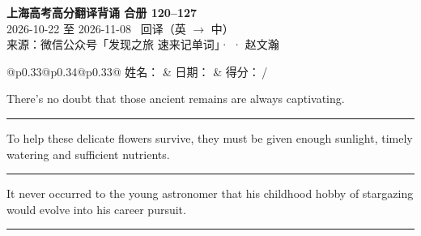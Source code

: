 \documentclass[11pt,a4paper]{article}
\newcommand{\num}[1]{\makebox[1.9em][r]{#1.}\hspace{0.3em}}
\newcommand{\wline}{\noindent\rule{\linewidth}{0.4pt}}
\begin{document}
\pagestyle{plain}
\begin{center}
{\LARGE\bfseries 上海高考高分翻译背诵 \quad 合册 120–127}\\[0.25em]
{\large 2026-10-22 至 2026-11-08 \quad\ 回译（英 $\to$ 中）}\\[0.35em]
{\footnotesize 来源：微信公众号「发现之旅 速来记单词」·  · 赵文瀚}
\end{center}

\vspace{0.4em}
\noindent\begin{tabular}{@{}p{0.33\textwidth}@{}p{0.34\textwidth}@{}p{0.33\textwidth}@{}}
姓名：\underline{\hspace{2.0cm}} & 日期：\underline{\hspace{2.0cm}} & 得分：\underline{\hspace{1.4cm}}\,/ \\
\end{tabular}

\vspace{0.5em}

\vspace{0.8em}
\vspace{0.35em}\vspace{0.15em}

\begin{minipage}{\linewidth}

\num{1}There’s no doubt that those ancient remains are always captivating.

\vspace{0.25em}

\wline

\end{minipage}

\begin{minipage}{\linewidth}

\num{2}To help these delicate flowers survive, they must be given enough sunlight, timely watering and sufficient nutrients.

\vspace{0.25em}

\wline

\end{minipage}

\begin{minipage}{\linewidth}

\num{3}It never occurred to the young astronomer that his childhood hobby of stargazing would evolve into his career pursuit.

\vspace{0.25em}

\wline

\end{minipage}
\end{document}
